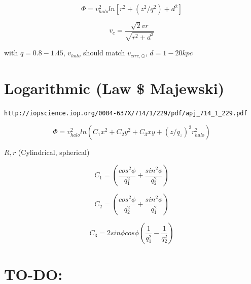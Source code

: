 \documentclass[a4paper, 12pt]{article} %
\begin{document}
\begin{equation}
\Phi = v^2_{halo} ln[r^2 + (z^2/q^2) + d^2]
\end{equation}

\begin{equation}
v_c = \dfrac{\sqrt{2}vr}{\sqrt{r^2 + d^2}}
\end{equation}

with $q=0.8-1.45$, $v_{halo}$ should match $v_{circ, \odot}$, $d=1-20kpc$




\section{Logarithmic (Law \$ Majewski)}
\verb+http://iopscience.iop.org/0004-637X/714/1/229/pdf/apj_714_1_229.pdf+

\begin{equation}
\Phi = v^2_{halo} ln(C_1 x^2 + C_2y^2 + C_3 xy + (z/q_z)^2 r_{halo}^2)
\end{equation}

$R, r$ (Cylindrical, spherical)

\begin{equation}
C_1 = \left( \dfrac{cos^2 \phi}{q_1^2} + \dfrac{sin^2 \phi}{q_2^2}   \right)
\end{equation}

\begin{equation}
C_2 = \left( \dfrac{cos^2 \phi}{q_2^2} + \dfrac{sin^2 \phi}{q_1^2} \right)
\end{equation}

\begin{equation}
C_3 = 2 sin \phi cos\phi \left( \dfrac{1}{q_1^2} - \dfrac{1}{q_2^2} \right)
\end{equation}

\section{TO-DO:}
\end{document}
